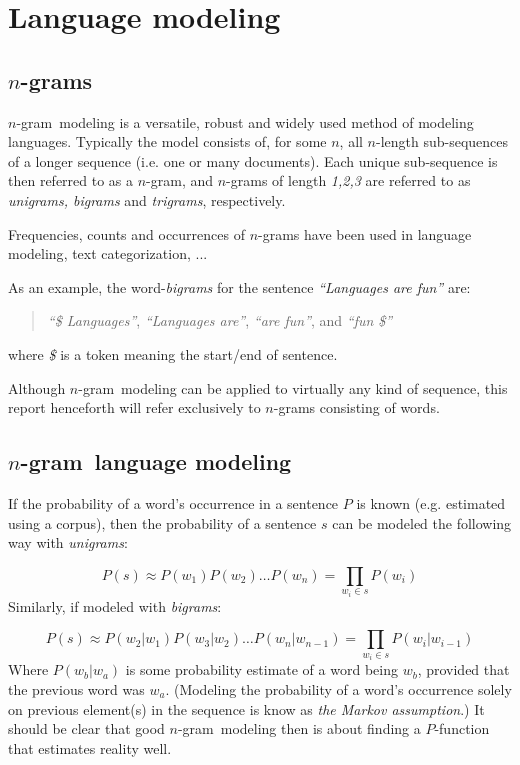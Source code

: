 \documentclass[a4paper,11pt]{kth-mag}
\newcommand{\todo}{ ... }
\newcommand{\ngram}{$n$-gram}
\begin{document}
\section{Language modeling}

\subsection{\ngram s}
\ngram~modeling is a versatile, robust and widely used method of modeling languages. Typically the model consists of, for some $n$, all $n$-length sub-sequences of a longer sequence (i.e. one or many documents). Each unique sub-sequence is then referred to as a \ngram, and \ngram s of length \emph{1,2,3} are referred to as \emph{unigrams, bigrams} and \emph{trigrams}, respectively\cite{ngrams}.

Frequencies, counts and occurrences of \ngram s have been used in language modeling\cite{chen_goodman}, text categorization\cite{ngrams}, \todo

As an example, the word-\emph{bigrams} for the sentence \emph{``Languages are fun''} are:
\begin{quote}
  \vspace*{0.1cm}
  \centering
\emph{``\$ Languages''}, \emph{``Languages are''}, \emph{``are fun''}, and \emph{``fun \$''}
\end{quote}
where \emph{\$} is a token meaning the start/end of sentence.

Although \ngram~modeling can be applied to virtually any kind of sequence, this report henceforth will refer exclusively to \ngram s consisting of words.

\subsection{\ngram~language modeling}
If the probability of a word's occurrence in a sentence $P$ is known (e.g. estimated using a corpus), then the probability of a sentence $s$ can be modeled the following way with \emph{unigrams}:

\begin{equation} \label{eq:unigram_chain_prob}
P(s) \approx P(w_1) P(w_2) \dots P(w_n) =\prod_{w_i \in s}P(w_i)
\end{equation}
Similarly, if modeled with \emph{bigrams}:

\begin{equation} \label{eq:bigram_chain_prob}
P(s) \approx P(w_2 | w_1)P(w_3 | w_2) \dots P(w_n | w_{n-1}) = \prod_{w_i \in s}P(w_i|w_{i-1})
\end{equation}
Where $P(w_b | w_a)$ is some probability estimate of a word being $w_b$, provided that the previous word was $w_a$. (Modeling the probability of a word's occurrence solely on previous element(s) in the sequence is know as \emph{the Markov assumption}.) It should be clear that good \ngram~modeling then is about finding a $P$-function that estimates reality well.
\end{document}

